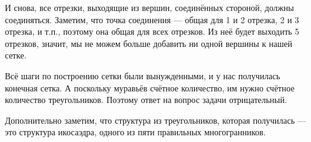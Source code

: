 \begin{itemize}
\begin{center}\end{center}

И снова, все отрезки, выходящие из вершин, соединённых стороной, должны соединяться.
Заметим, что точка соединения --- общая для 1 и 2 отрезка, 2 и 3 отрезка, и т.п., поэтому 
она общая для всех отрезков. Из неё будет выходить 5 отрезков, значит, мы не можем
больше добавить ни одной вершины к нашей сетке. 

Всё шаги по построению сетки были вынужденными, и у нас получилась конечная сетка.
А поскольку муравьёв счётное количество, им нужно счётное количество треугольников.
Поэтому ответ на вопрос задачи отрицательный.

Дополнительно заметим, что структура из треугольников, которая получилась --- это
структура икосаэдра, одного из пяти правильных многогранников.



\end{itemize}
